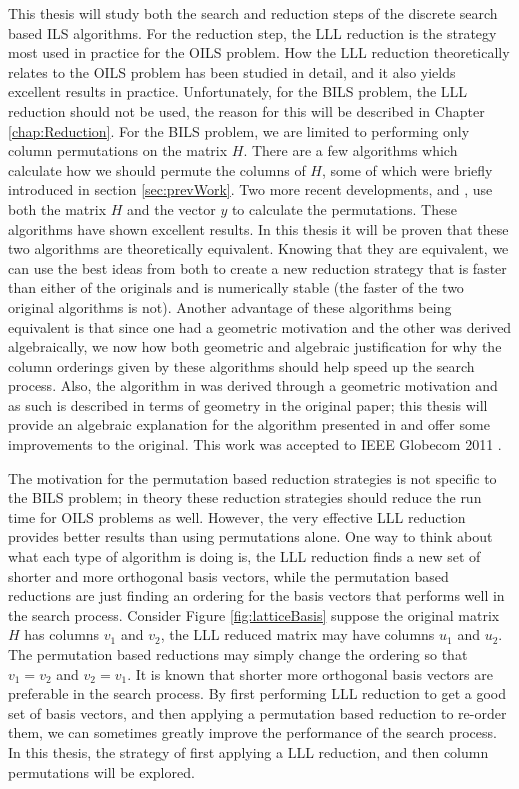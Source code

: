 \documentclass[12pt,Bold,letterpaper]{mcgilletdclass}
\begin{document}
This thesis will study both the search and reduction steps of the discrete search based ILS algorithms. For the reduction step, the LLL reduction \cite{LenLL82} is the strategy most used in practice for the OILS problem. How the LLL reduction theoretically relates to the OILS problem has been studied in detail, and it also yields excellent results in practice. Unfortunately, for the BILS problem, the LLL reduction should not be used, the reason for this will be described in Chapter \ref{chap:Reduction}. For the BILS problem, we are limited to performing only column permutations on the matrix $H$. There are a few algorithms which calculate how we should permute the columns of $H$, some of which were briefly introduced in section \ref{sec:prevWork}. Two more recent developments, \cite{ChaH05} and \cite{SuW05}, use both the matrix $H$ and the vector $y$ to calculate the permutations. These algorithms have shown excellent results. In this thesis it will be proven that these two algorithms are theoretically equivalent. Knowing that they are equivalent, we can use the best ideas from both to create a new reduction strategy that is faster than either of the originals and is numerically stable (the faster of the two original algorithms is not). Another advantage of these algorithms being equivalent is that since one had a geometric motivation and the other was derived algebraically, we now how both geometric and algebraic justification for why the column orderings given by these algorithms should help speed up the search process. Also, the algorithm in \cite{SuW05} was derived through a geometric motivation and as such is described in terms of geometry in the original paper; this thesis will provide an algebraic explanation for the algorithm presented in \cite{SuW05} and offer some improvements to the original. This work was accepted to IEEE Globecom 2011 \cite{BreC11}.

The motivation for the permutation based reduction strategies is not specific to the BILS problem; in theory these reduction strategies should reduce the run time for OILS problems as well. However, the very effective LLL reduction provides better results than using permutations alone. One way to think about what each type of algorithm is doing is, the LLL reduction finds a new set of shorter and more orthogonal basis vectors, while the permutation based reductions are just finding an ordering for the basis vectors that performs well in the search process. Consider Figure \ref{fig:latticeBasis} suppose the original matrix $H$ has columns $v_1$ and $v_2$, the LLL reduced matrix may have columns $u_1$ and $u_2$. The permutation based reductions may simply change the ordering so that $v_1 = v_2$ and $v_2 = v_1$. It is known that shorter more orthogonal basis vectors are preferable in the search process. By first performing LLL reduction to get a good set of basis vectors, and then applying a permutation based reduction to re-order them, we can sometimes greatly improve the performance of the search process. In this thesis, the strategy of first applying a LLL reduction, and then column permutations will be explored.
\end{document}
